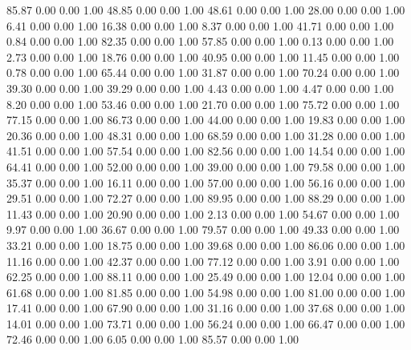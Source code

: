    85.87   0.00   0.00   1.00
   48.85   0.00   0.00   1.00
   48.61   0.00   0.00   1.00
   28.00   0.00   0.00   1.00
    6.41   0.00   0.00   1.00
   16.38   0.00   0.00   1.00
    8.37   0.00   0.00   1.00
   41.71   0.00   0.00   1.00
    0.84   0.00   0.00   1.00
   82.35   0.00   0.00   1.00
   57.85   0.00   0.00   1.00
    0.13   0.00   0.00   1.00
    2.73   0.00   0.00   1.00
   18.76   0.00   0.00   1.00
   40.95   0.00   0.00   1.00
   11.45   0.00   0.00   1.00
    0.78   0.00   0.00   1.00
   65.44   0.00   0.00   1.00
   31.87   0.00   0.00   1.00
   70.24   0.00   0.00   1.00
   39.30   0.00   0.00   1.00
   39.29   0.00   0.00   1.00
    4.43   0.00   0.00   1.00
    4.47   0.00   0.00   1.00
    8.20   0.00   0.00   1.00
   53.46   0.00   0.00   1.00
   21.70   0.00   0.00   1.00
   75.72   0.00   0.00   1.00
   77.15   0.00   0.00   1.00
   86.73   0.00   0.00   1.00
   44.00   0.00   0.00   1.00
   19.83   0.00   0.00   1.00
   20.36   0.00   0.00   1.00
   48.31   0.00   0.00   1.00
   68.59   0.00   0.00   1.00
   31.28   0.00   0.00   1.00
   41.51   0.00   0.00   1.00
   57.54   0.00   0.00   1.00
   82.56   0.00   0.00   1.00
   14.54   0.00   0.00   1.00
   64.41   0.00   0.00   1.00
   52.00   0.00   0.00   1.00
   39.00   0.00   0.00   1.00
   79.58   0.00   0.00   1.00
   35.37   0.00   0.00   1.00
   16.11   0.00   0.00   1.00
   57.00   0.00   0.00   1.00
   56.16   0.00   0.00   1.00
   29.51   0.00   0.00   1.00
   72.27   0.00   0.00   1.00
   89.95   0.00   0.00   1.00
   88.29   0.00   0.00   1.00
   11.43   0.00   0.00   1.00
   20.90   0.00   0.00   1.00
    2.13   0.00   0.00   1.00
   54.67   0.00   0.00   1.00
    9.97   0.00   0.00   1.00
   36.67   0.00   0.00   1.00
   79.57   0.00   0.00   1.00
   49.33   0.00   0.00   1.00
   33.21   0.00   0.00   1.00
   18.75   0.00   0.00   1.00
   39.68   0.00   0.00   1.00
   86.06   0.00   0.00   1.00
   11.16   0.00   0.00   1.00
   42.37   0.00   0.00   1.00
   77.12   0.00   0.00   1.00
    3.91   0.00   0.00   1.00
   62.25   0.00   0.00   1.00
   88.11   0.00   0.00   1.00
   25.49   0.00   0.00   1.00
   12.04   0.00   0.00   1.00
   61.68   0.00   0.00   1.00
   81.85   0.00   0.00   1.00
   54.98   0.00   0.00   1.00
   81.00   0.00   0.00   1.00
   17.41   0.00   0.00   1.00
   67.90   0.00   0.00   1.00
   31.16   0.00   0.00   1.00
   37.68   0.00   0.00   1.00
   14.01   0.00   0.00   1.00
   73.71   0.00   0.00   1.00
   56.24   0.00   0.00   1.00
   66.47   0.00   0.00   1.00
   72.46   0.00   0.00   1.00
    6.05   0.00   0.00   1.00
   85.57   0.00   0.00   1.00
